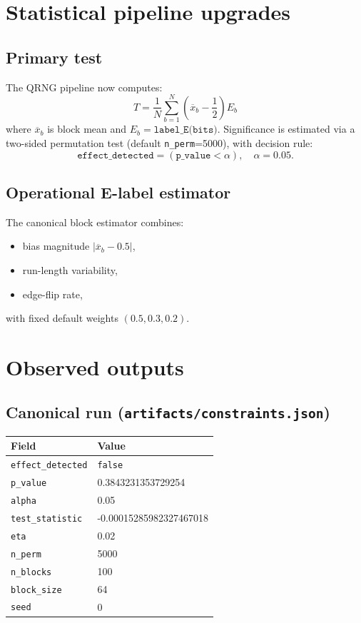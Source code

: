 \documentclass[11pt]{article}
\begin{document}
\section{Statistical pipeline upgrades}
\subsection{Primary test}
The QRNG pipeline now computes:
\[
T = \frac{1}{N}\sum_{b=1}^{N}\left(\overline{x}_b-\frac{1}{2}\right)E_b
\]
where $\overline{x}_b$ is block mean and $E_b=\texttt{label\_E(bits)}$.
Significance is estimated via a two-sided permutation test (default \texttt{n\_perm}=5000), with decision rule:
\[
\texttt{effect\_detected} = (\texttt{p\_value}<\alpha), \quad \alpha=0.05.
\]

\subsection{Operational E-label estimator}
The canonical block estimator combines:
\begin{itemize}
\item bias magnitude $\left|\overline{x}_b-0.5\right|$,
\item run-length variability,
\item edge-flip rate,
\end{itemize}
with fixed default weights $(0.5,0.3,0.2)$.

\section{Observed outputs}
\subsection{Canonical run (\texttt{artifacts/constraints.json})}
\begin{center}
\begin{tabular}{ll}
\toprule
Field & Value \\
\midrule
\texttt{effect\_detected} & \texttt{false} \\
\texttt{p\_value} & 0.3843231353729254 \\
\texttt{alpha} & 0.05 \\
\texttt{test\_statistic} & -0.00015285982327467018 \\
\texttt{eta} & 0.02 \\
\texttt{n\_perm} & 5000 \\
\texttt{n\_blocks} & 100 \\
\texttt{block\_size} & 64 \\
\texttt{seed} & 0 \\
\bottomrule
\end{tabular}
\end{center}
\end{document}
